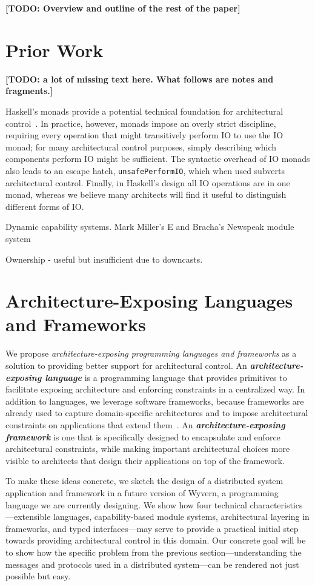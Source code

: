 \documentclass[runningheads]{llncs}
\newcommand{\TODO}[1]{\textbf{[TODO: #1]}}
\begin{document}
\begin{sloppypar}
\TODO{Overview and outline of the rest of the paper}


\section{Prior Work}

\TODO{a lot of missing text here.  What follows are notes and fragments.}

Haskell's monads provide a potential technical foundation for architectural control~\cite{Haskell-monads}.  In practice, however, monads impose an overly strict discipline, requiring every operation that might transitively perform IO to use the IO monad; for many architectural control purposes, simply describing which components perform IO might be sufficient.  The syntactic overhead of IO monads also leads to an escape hatch, \texttt{unsafePerformIO}, which when used subverts architectural control.  Finally, in Haskell's design all IO operations are in one monad, whereas we believe many architects will find it useful to distinguish different forms of IO.

Dynamic capability systems.  Mark Miller's E and Bracha's Newspeak module system

Ownership - useful but insufficient due to downcasts.


\section{Architecture-Exposing Languages and Frameworks}

We propose \emph{architecture-exposing programming languages and frameworks} as a solution to providing better support for architectural control.  An \emph\textbf{architecture-exposing language} is a programming language that provides primitives to facilitate exposing architecture and enforcing constraints in a centralized way.  In addition to languages, we leverage software frameworks, because frameworks are already used to capture domain-specific architectures and to impose architectural constraints on applications that extend them~\cite{JaspanThesis}.  An \emph\textbf{architecture-exposing framework} is one that is specifically designed to encapsulate and enforce architectural constraints, while making important architectural choices more visible to architects that design their applications on top of the framework.

To make these ideas concrete, we sketch the design of a distributed system application and framework in a future version of Wyvern, a programming language we are currently designing.  We show how four technical characteristics---extensible languages, capability-based module systems, architectural layering in frameworks, and typed interfaces---may serve to provide a practical initial step towards providing architectural control in this domain.  Our concrete goal will be to show how the specific problem from the previous section---understanding the messages and protocols used in a distributed system---can be rendered not just possible but easy.



\end{sloppypar}
\end{document}
